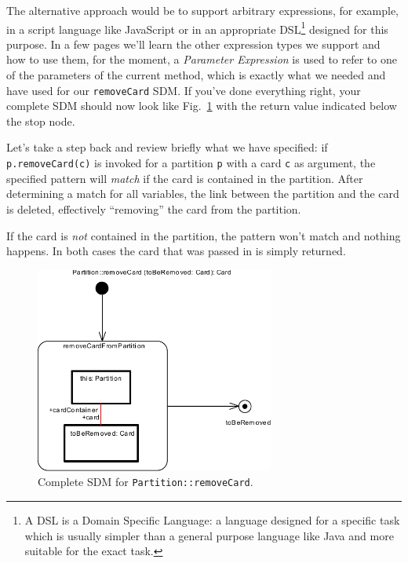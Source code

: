 The alternative approach would be to support arbitrary expressions, for example, in a script language like JavaScript or in an appropriate DSL\footnote{A DSL is a Domain Specific Language: a language designed for a specific task which is usually simpler than a general purpose language like Java and more suitable for the exact task.} designed for this purpose. 
In a few pages we'll learn the other expression types
we support and how to use them, for the moment, a \emph{Parameter Expression} is used to refer to one of the parameters of the current method, which is exactly what we needed and have used for our \texttt{removeCard} SDM.
If you've done everything right, your complete SDM should now look like Fig.~\ref{fig:sdm_complete_control_flow} with the return value indicated below the stop node.

Let's take a step back and review briefly what we have specified:  if \texttt{p.remove\-Card(c)} is invoked for a partition \texttt{p} with a card \texttt{c} as argument, the specified pattern will \emph{match} if the card is contained in the partition.
After determining a match for all variables, the link between the partition and the card is deleted, effectively ``removing'' the card from the partition.  

If the card is \emph{not} contained in the partition, the pattern won't match and nothing happens. 
In both cases the card that was passed in is simply returned.

\begin{figure}[htbp]
\begin{center}
  \includegraphics[width=0.7\textwidth]{pics/sdmBilder/removeCard/sdm15}
  \caption{Complete SDM for \texttt{Partition::removeCard}.}  
  \label{fig:sdm_complete_control_flow}
\end{center}
\end{figure}

